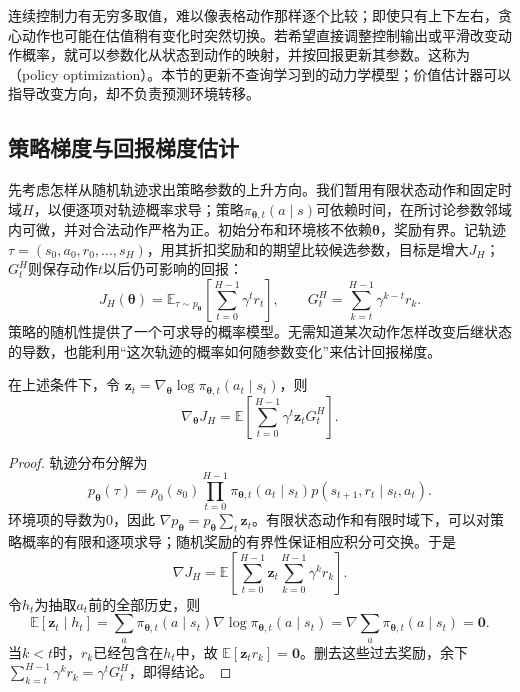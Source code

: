 连续控制力有无穷多取值，难以像表格动作那样逐个比较；即使只有上下左右，贪心动作也可能在估值稍有变化时突然切换。若希望直接调整控制输出或平滑改变动作概率，就可以参数化从状态到动作的映射，并按回报更新其参数。这称为（policy optimization）。本节的更新不查询学习到的动力学模型；价值估计器可以指导改变方向，却不负责预测环境转移。

\subsection{策略梯度与回报梯度估计}
\label{sec:rl-learning-policy-gradient}

先考虑怎样从随机轨迹求出策略参数的上升方向。我们暂用有限状态动作和固定时域$H$，以便逐项对轨迹概率求导；策略$\pi_{\bm\theta,t}(a\mid s)$可依赖时间，在所讨论参数邻域内可微，并对合法动作严格为正。初始分布和环境核不依赖$\bm\theta$，奖励有界。记轨迹$\tau=(s_0,a_0,r_0,\ldots,s_H)$，用其折扣奖励和的期望比较候选参数，目标是增大$J_H$；$G_t^H$则保存动作$t$以后仍可影响的回报：
\begin{equation}
  J_H(\bm\theta)=\mathbb E_{\tau\sim p_{\bm\theta}}
      \left[\sum_{t=0}^{H-1}\gamma^t r_t\right],
  \qquad
  G_t^{H}=\sum_{k=t}^{H-1}\gamma^{k-t}r_k .
  \label{eq:rl-learning-finite-policy-objective}
\end{equation}
策略的随机性提供了一个可求导的概率模型。无需知道某次动作怎样改变后继状态的导数，也能利用“这次轨迹的概率如何随参数变化”来估计回报梯度。

\begin{theorem}[有限时域似然比策略梯度]
  \label{thm:rl-learning-likelihood-gradient}
  在上述条件下，令
  $\bm{z}_t=\nabla_{\bm\theta}\log\pi_{\bm\theta,t}(a_t\mid s_t)$，则
  \begin{equation}
    \nabla_{\bm\theta}J_H
       =\mathbb E\left[
          \sum_{t=0}^{H-1}\gamma^t\bm{z}_tG_t^H\right].
    \label{eq:rl-learning-reward-to-go}
  \end{equation}
\end{theorem}
\begin{proof}
  轨迹分布分解为
  \[
    p_{\bm\theta}(\tau)=\rho_0(s_0)
       \prod_{t=0}^{H-1}
       \pi_{\bm\theta,t}(a_t\mid s_t)
       p(s_{t+1},r_t\mid s_t,a_t).
  \]
  环境项的导数为0，因此
  $\nabla p_{\bm\theta}=p_{\bm\theta}\sum_t\bm{z}_t$。有限状态动作和有限时域下，可以对策略概率的有限和逐项求导；随机奖励的有界性保证相应积分可交换。于是
  \[
    \nabla J_H
      =\mathbb E\left[
        \sum_{t=0}^{H-1}\bm{z}_t
        \sum_{k=0}^{H-1}\gamma^k r_k\right].
  \]
  令$h_t$为抽取$a_t$前的全部历史，则
  \[
    \mathbb E[\bm{z}_t\mid h_t]
       =\sum_a\pi_{\bm\theta,t}(a\mid s_t)
          \nabla\log\pi_{\bm\theta,t}(a\mid s_t)
       =\nabla\sum_a\pi_{\bm\theta,t}(a\mid s_t)=\bm0.
  \]
  当$k<t$时，$r_k$已经包含在$h_t$中，故
  $\mathbb E[\bm{z}_t r_k]=\bm0$。删去这些过去奖励，余下
  $\sum_{k=t}^{H-1}\gamma^k r_k=\gamma^tG_t^H$，即得结论。
\end{proof}

